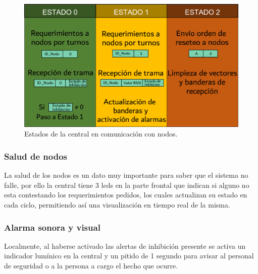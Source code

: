 \begin{figure}[h!]
	\centering
	\includegraphics[scale=.53]{images/central/maquina-estado-central.png}
    \caption{Estados de la central en comunicación con nodos.}
	\label{im:maq-est-central}
\end{figure}


\subsubsection{Salud de nodos}
\par La salud de los nodos es un dato muy importante para saber que el sistema no falle, por ello la central tiene 3 leds en la parte frontal que indican si alguno no esta contestando los requerimientos pedidos, los cuales actualizan su estado en cada ciclo, permitiendo así una visualización en tiempo real de la misma. 

\subsubsection{Alarma sonora y visual}
\par Localmente, al haberse activado las alertas de inhibición presente se activa un indicador lumínico en la central y un pitido de 1 segundo para avisar al personal de seguridad o a la persona a cargo el hecho que ocurre. 

